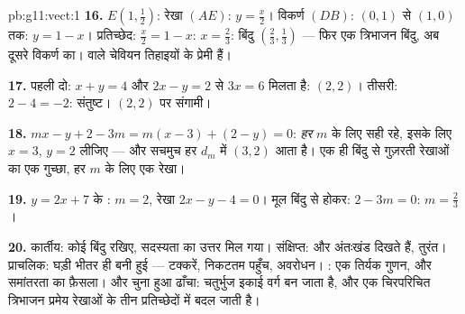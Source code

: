 \begin{solution}{pb:g11:vect:1}
\textbf{16.} $E\left(1, \frac12\right)$: रेखा $(AE)$: $y = \frac x2$। विकर्ण $(DB)$: $(0,1)$ से $(1,0)$ तक:
$y = 1 - x$। प्रतिच्छेद: $\frac x2 = 1 - x$: $x = \frac23$: बिंदु $\left(\frac23, \frac13\right)$ --- फिर एक त्रिभाजन बिंदु, अब
दूसरे विकर्ण का।  वाले चेवियन तिहाइयों के प्रेमी हैं।

\textbf{17.} पहली दो: $x + y = 4$ और $2x - y = 2$ से $3x = 6$ मिलता है: $(2, 2)$। तीसरी: $2 - 4 = -2$:
संतुष्ट। $(2, 2)$ पर संगामी।

\textbf{18.} $mx - y + 2 - 3m = m(x - 3) + (2 - y) = 0$:  \emph{हर} $m$ के लिए सही रहे, इसके लिए $x = 3$,
$y = 2$ लीजिए --- और सचमुच हर $d_m$ में $(3, 2)$ आता है। एक ही बिंदु से गुज़रती
रेखाओं का एक गुच्छा, हर  $m$ के लिए एक रेखा।

\textbf{19.} $y = 2x + 7$ के :  $m = 2$, रेखा $2x - y - 4 = 0$। मूल बिंदु से होकर:
$2 - 3m = 0$: $m = \frac23$।

\textbf{20.} कार्तीय: कोई बिंदु रखिए, सदस्यता का उत्तर मिल गया। संक्षिप्त:
 और अंतःखंड दिखते हैं,  तुरंत। प्राचलिक: घड़ी भीतर ही बनी हुई ---
टक्करें, निकटतम पहुँच, अवरोधन। : एक तिर्यक गुणन, और समांतरता का फ़ैसला।
और चुना हुआ ढाँचा:  चतुर्भुज इकाई वर्ग बन जाता है, और एक चिरपरिचित
त्रिभाजन प्रमेय रेखाओं के तीन प्रतिच्छेदों में बदल जाती है।
\end{solution}
